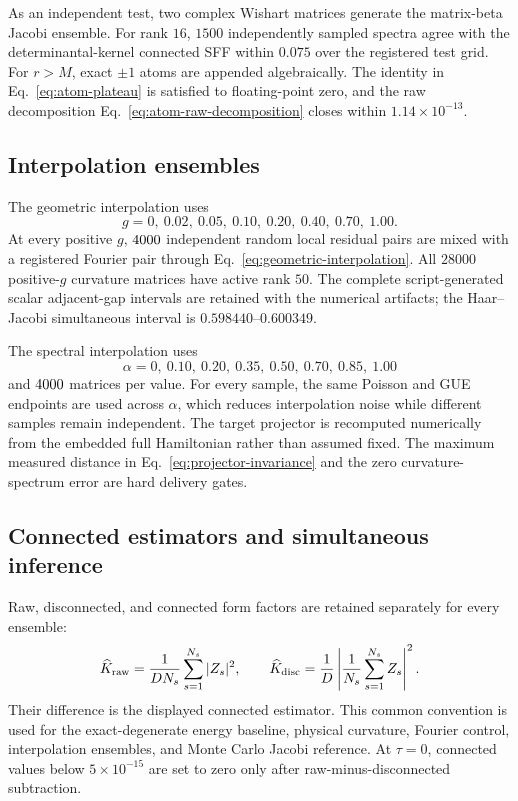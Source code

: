 As an independent test, two complex Wishart matrices generate the
matrix-beta Jacobi ensemble.
For rank \(16\), \(1500\) independently sampled spectra agree with the
determinantal-kernel connected SFF within \(0.075\) over the registered test
grid.
For \(r>M\), exact \(\pm1\) atoms are appended algebraically.
The identity in Eq.~\eqref{eq:atom-plateau} is satisfied to floating-point
zero, and the raw decomposition
Eq.~\eqref{eq:atom-raw-decomposition} closes within
\(1.14\times10^{-13}\).

\subsection{Interpolation ensembles}

The geometric interpolation uses
\[
 g=0,\ 0.02,\ 0.05,\ 0.10,\ 0.20,\ 0.40,\ 0.70,\ 1.00 .
\]
At every positive \(g\), \(4000\) independent random
local residual pairs are mixed with a registered Fourier pair through
Eq.~\eqref{eq:geometric-interpolation}.
All \(28000\) positive-\(g\) curvature matrices have active rank \(50\).
The complete script-generated scalar adjacent-gap intervals are retained with
the numerical artifacts; the Haar--Jacobi simultaneous interval is
\(0.598440\)--\(0.600349\).

The spectral interpolation uses
\[
 \alpha=0,\ 0.10,\ 0.20,\ 0.35,\ 0.50,\ 0.70,\ 0.85,\ 1.00
\]
and \(4000\) matrices per value.
For every sample, the same Poisson and GUE endpoints are used across
\(\alpha\), which reduces interpolation noise while different samples remain
independent.
The target projector is recomputed numerically from the embedded full
Hamiltonian rather than assumed fixed.
The maximum measured distance in
Eq.~\eqref{eq:projector-invariance} and the zero curvature-spectrum error are
hard delivery gates.

\subsection{Connected estimators and simultaneous inference}

Raw, disconnected, and connected form factors are retained separately for
every ensemble:
\begin{equation}
 \widehat K_{\rm raw}
 =\frac{1}{D N_s}\sum_{s=1}^{N_s}|Z_s|^2,\qquad
 \widehat K_{\rm disc}
 =\frac{1}{D}\left|\frac{1}{N_s}\sum_{s=1}^{N_s}Z_s\right|^2 .
 \label{eq:empirical-sff}
\end{equation}
Their difference is the displayed connected estimator.
This common convention is used for the exact-degenerate energy baseline,
physical curvature, Fourier control, interpolation ensembles, and Monte Carlo
Jacobi reference.
At \(\tau=0\), connected values below \(5\times10^{-15}\) are set to zero
only after raw-minus-disconnected subtraction.

